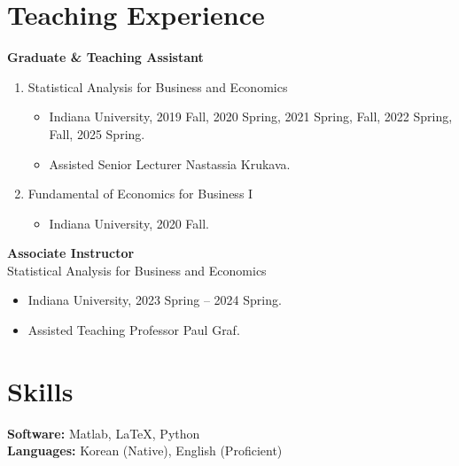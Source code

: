 \documentclass[11pt,a4paper]{article}
\begin{document}
\section*{Teaching Experience}
\textbf{Graduate \& Teaching Assistant} 
\begin{enumerate}[leftmargin=*]   
\item Statistical Analysis for Business and Economics
    \begin{itemize}[leftmargin=*]
        \item Indiana University, 2019 Fall, 2020 Spring, 2021 Spring, Fall, 2022 Spring, Fall, 2025 Spring.
        \item Assisted Senior Lecturer Nastassia Krukava.
    \end{itemize}    
\item Fundamental of Economics for Business I
    \begin{itemize}[leftmargin=*]
        \item Indiana University, 2020 Fall.
    \end{itemize}
\end{enumerate}

\textbf{Associate Instructor}\\
Statistical Analysis for Business and Economics
\begin{itemize}
    \item Indiana University, 2023 Spring -- 2024 Spring.
    \item Assisted Teaching Professor Paul Graf.
\end{itemize}


\section*{Skills}
\textbf{Software:} Matlab, LaTeX, Python \\
\textbf{Languages:} Korean (Native), English (Proficient)
\end{document}
